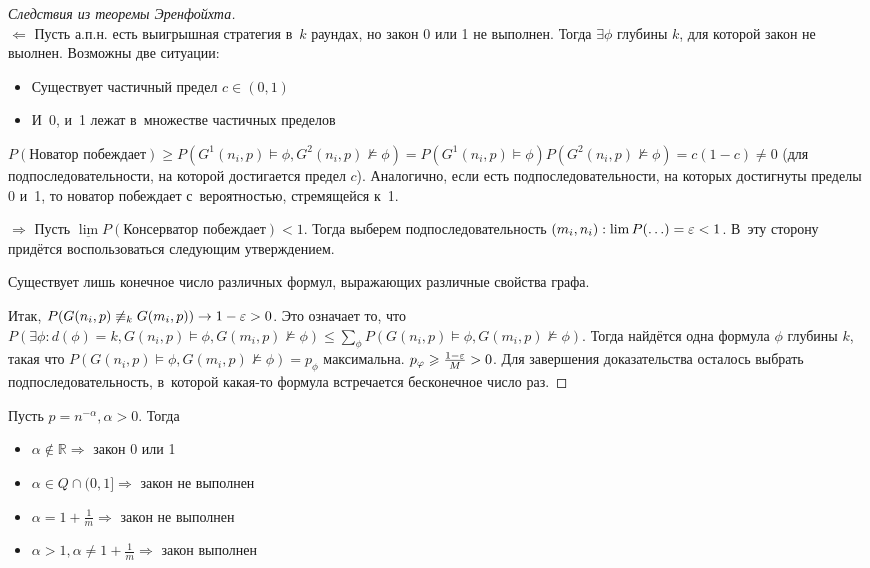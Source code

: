 \documentclass{article}
\begin{document}
\begin{proof}[Следствия из теоремы Эренфойхта]~\\
	$\Leftarrow$ Пусть а.п.н. есть выигрышная стратегия в~$k$ раундах, но закон 0 или 1 не выполнен.
	Тогда $\exists \phi$ глубины $k$, для которой закон не выолнен. Возможны две ситуации:
	\begin{itemize}
		\item Существует частичный предел $c \in (0, 1)$
		\item И~0, и~1 лежат в~множестве частичных пределов
	\end{itemize}

	$P(\text{Новатор побеждает}) \ge P(G^1(n_i, p) \models \phi, G^2(n_i, p) \not\models \phi) =
	P(G^1(n_i, p) \models \phi) P(G^2(n_i, p) \not\models \phi) = c(1 - c) \ne 0$ (для
	подпоследовательности, на которой достигается предел $c$). Аналогично, если есть
	подпоследовательности, на которых достигнуты пределы 0 и~1, то новатор побеждает с~вероятностью,
	стремящейся к~1.

	$\Rightarrow$ Пусть $\underline{\lim} P(\text{Консерватор побеждает}) < 1$. Тогда выберем
	подпоследовательность $(m_i, n_i): \lim P(\ldots) = \varepsilon < 1$. В~эту сторону придётся
	воспользоваться следующим утверждением.

	\begin{claim}
		Существует лишь конечное число различных формул, выражающих различные свойства графа.
	\end{claim}

	Итак, $P(G(n_i, p) \not\equiv_k G(m_i, p)) \rightarrow 1 - \varepsilon > 0$. Это означает то, что
	$P(\exists \phi: d(\phi) = k, G(n_i, p) \models \phi, G(m_i, p) \not\models \phi) \le
	\sum\limits_\phi P(G(n_i, p) \models \phi, G(m_i, p) \not\models \phi)$. Тогда найдётся одна
	формула $\phi$ глубины $k$, такая что $P(G(n_i, p) \models \phi, G(m_i, p) \not\models \phi) =
	p_\phi$ максимальна.  $p_\varphi \geqslant \frac{1 - \varepsilon}{M} > 0$. Для завершения доказательства осталось
	выбрать подпоследовательность, в~которой какая-то формула встречается бесконечное число раз.
\end{proof}

\begin{theorem}
	Пусть $p = n^{-\alpha}, \alpha > 0$. Тогда
	\begin{itemize}
		\item $\alpha \notin \mathbb{R} \Rightarrow $ закон 0 или 1
		\item $\alpha \in Q \cap (0, 1] \Rightarrow $ закон не выполнен
		\item $\alpha = 1 + \frac{1}{m} \Rightarrow $ закон не выполнен
		\item $\alpha > 1, \alpha \ne 1 + \frac{1}{m} \Rightarrow $ закон выполнен
	\end{itemize}
\end{theorem}
\end{document}
